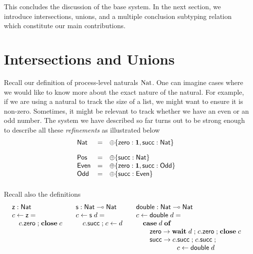 \documentclass[submission,copyright,creativecommons]{eptcs}
\newcommand{\m}[1]{\mathsf{#1}}
\newcommand{\mb}[1]{\mbox{\bf #1}}
\newcommand{\semi}{\mathrel{;}}
\begin{document}
This concludes the discussion of the base system. In the next section, we introduce intersections, unions, and a multiple conclusion subtyping relation which constitute our main contributions.

\section{Intersections and Unions}
\label{refinements}

Recall our definition of process-level naturals $\nat$. One can imagine cases where we would like to know more about the exact nature of the natural. For example, if we are using a natural to track the size of a list, we might want to ensure it is non-zero. Sometimes, it might be relevant to track whether we have an even or an odd number. The system we have described so far turns out to be strong enough to describe all these \emph{refinements} as illustrated below
\[
\begin{array}{lcll}
  \m{Nat} & = & \internal\{\m{zero} : \terminate, \m{succ} : \m{Nat}\} \\[1em]
  \m{Pos} & = & \internal\{\m{succ} : \m{Nat}\} \\
  \m{Even} & = & \internal\{\m{zero} : \terminate, \m{succ} : \m{Odd}\} \\
  \m{Odd} & = & \internal\{\m{succ} : \m{Even}\} \\[1em]
\end{array}
\]
Recall also the definitions
\[
\begin{array}{l@{\hspace{2em}}l@{\hspace{2em}}l}
  \m{z} : \m{Nat} & \m{s} : \m{Nat} \lolli \m{Nat} & \m{double} : \m{Nat} \lolli \m{Nat} \\
  c \leftarrow \m{z} = & c \leftarrow \m{s}\; d = & c \leftarrow \m{double}\; d = \\
  \quad c.\m{zero} \semi \mb{close}\; c & \quad c.\m{succ} \semi c \leftarrow d & \quad \mb{case}\; d\; \mb{of} \\
& & \quad\quad \m{zero} \rightarrow \mb{wait}\; d \semi c.\m{zero} \semi \mb{close}\; c \\
& & \quad\quad \m{succ} \rightarrow c.\m{succ} \semi c.\m{succ} \semi \\
& & \hspace{6em} c \leftarrow \m{double}\; d
\end{array}
\]
\end{document}
